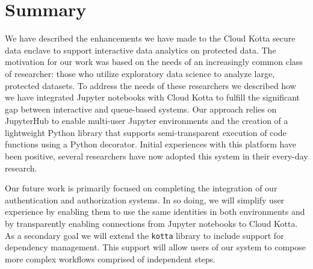 \section{Summary}

We have described the enhancements we have made to the Cloud Kotta
secure data enclave to support interactive data analytics on protected data. 
The motivation for our work was based on the needs of an increasingly common
class of researcher: those who utilize exploratory data science to analyze large, protected datasets.
To address the needs of these researchers we described how we have integrated Jupyter notebooks 
with Cloud Kotta to fulfill the significant gap between interactive and queue-based systems. 
Our approach relies on JupyterHub to enable multi-user Jupyter
environments and the creation of a lightweight Python library that supports semi-transparent execution
of code functions using a Python decorator. 
Initial experiences with this platform have been positive,  
several researchers have now adopted this system in their every-day 
research. 

Our future work is primarily focused on completing the integration
of our authentication and authorization systems. In so doing, we will
simplify user experience by enabling them to use the same identities
in both environments and by transparently enabling connections from 
Jupyter notebooks to Cloud Kotta. As a secondary goal we will extend
the \texttt{kotta} library to include support for dependency management.
This support will allow users of our system to compose more complex
workflows comprised of independent steps. 

%
